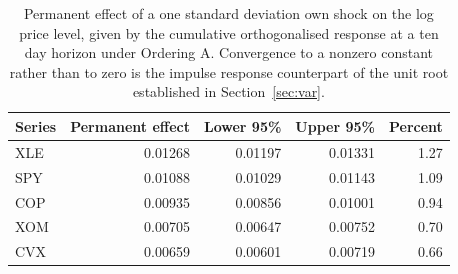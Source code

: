 \begin{table}[htbp]
\centering
\caption{Permanent effect of a one standard deviation own shock on the log price level, given by the cumulative orthogonalised response at a ten day horizon under Ordering A. Convergence to a nonzero constant rather than to zero is the impulse response counterpart of the unit root established in Section~\ref{sec:var}.} 
\label{tab:irf_longrun}
\begin{tabular}{lrrrr}
  \toprule
Series & Permanent effect & Lower 95\% & Upper 95\% & Percent \\ 
  \midrule
XLE & 0.01268 & 0.01197 & 0.01331 & 1.27 \\ 
  SPY & 0.01088 & 0.01029 & 0.01143 & 1.09 \\ 
  COP & 0.00935 & 0.00856 & 0.01001 & 0.94 \\ 
  XOM & 0.00705 & 0.00647 & 0.00752 & 0.70 \\ 
  CVX & 0.00659 & 0.00601 & 0.00719 & 0.66 \\ 
   \bottomrule
\end{tabular}
\end{table}
